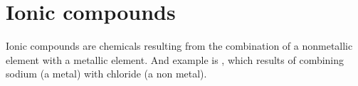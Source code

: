 \documentclass[main.tex]{subfiles}
\begin{document}
\section{Ionic compounds}
Ionic compounds are chemicals resulting from the combination of a nonmetallic element with a metallic element. And example is , which results of combining sodium (a metal) with chloride (a non metal).
\sloppy 
\end{document}
